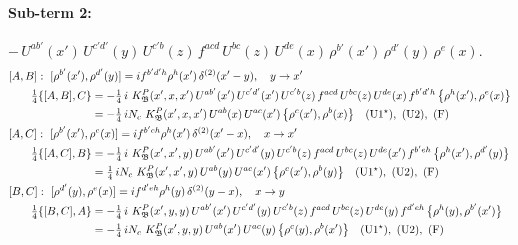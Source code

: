 \documentclass[10pt]{article}
\numberwithin{equation}{section}
\begin{document}
\paragraph{Sub-term 2:} $-\,U^{ab'}(x')\,U^{c'd'}(y)\,U^{c'b}(z)\,f^{acd}\,U^{bc}(z)\,U^{de}(x)\,\rho^{b'}(x')\,\rho^{d'}(y)\,\rho^{e}(x)$.
\begin{align}
&[A,B]:\ [\rho^{b'}(x'),\rho^{d'}(y)]=i f^{b'd'h}\rho^{h}(x')\,\delta^{(2)}(x'-y),\quad y\to x'\notag\\
&\qquad \tfrac14\{[A,B],C\}=-\tfrac14\,i\,\,K^{P}_{\mathfrak B}(x',x,x')\,U^{ab'}(x')\,U^{c'd'}(x')\,U^{c'b}(z)\,f^{acd}\,U^{bc}(z)\,U^{de}(x)\,f^{b'd'h}\,\big\{\rho^{h}(x'),\rho^{e}(x)\big\}\notag\\
&\qquad\phantom{\tfrac14\{[A,B],C\}}=-\tfrac14\,i N_{c}\,\,K^{P}_{\mathfrak B}(x',x,x')\,U^{ab}(x)\,U^{ac}(x')\,\big\{\rho^{c}(x'),\rho^{b}(x)\big\}\quad\text{(U1$^\star$)},\ \text{(U2)},\ \text{(F)}
\label{B:eq:GIII.I.P-2-AB}\\
&[A,C]:\ [\rho^{b'}(x'),\rho^{e}(x)]=i f^{b'eh}\rho^{h}(x')\,\delta^{(2)}(x'-x),\quad x\to x'\notag\\
&\qquad \tfrac14\{[A,C],B\}=-\tfrac14\,i\,\,K^{P}_{\mathfrak B}(x',x',y)\,U^{ab'}(x')\,U^{c'd'}(y)\,U^{c'b}(z)\,f^{acd}\,U^{bc}(z)\,U^{de}(x')\,f^{b'eh}\,\big\{\rho^{h}(x'),\rho^{d'}(y)\big\}\notag\\
&\qquad\phantom{\tfrac14\{[A,C],B\}}=\tfrac14\,i N_{c}\,\,K^{P}_{\mathfrak B}(x',x',y)\,U^{ab}(y)\,U^{ac}(x')\,\big\{\rho^{c}(x'),\rho^{b}(y)\big\}\quad\text{(U1$^\star$)},\ \text{(U2)},\ \text{(F)}
\label{B:eq:GIII.I.P-2-AC}\\
&[B,C]:\ [\rho^{d'}(y),\rho^{e}(x)]=i f^{d'eh}\rho^{h}(y)\,\delta^{(2)}(y-x),\quad x\to y\notag\\
&\qquad \tfrac14\{[B,C],A\}=-\tfrac14\,i\,\,K^{P}_{\mathfrak B}(x',y,y)\,U^{ab'}(x')\,U^{c'd'}(y)\,U^{c'b}(z)\,f^{acd}\,U^{bc}(z)\,U^{de}(y)\,f^{d'eh}\,\big\{\rho^{h}(y),\rho^{b'}(x')\big\}\notag\\
&\qquad\phantom{\tfrac14\{[B,C],A\}}=-\tfrac14\,i N_{c}\,\,K^{P}_{\mathfrak B}(x',y,y)\,U^{ab}(x')\,U^{ac}(y)\,\big\{\rho^{c}(y),\rho^{b}(x')\big\}\quad\text{(U1$^\star$)},\ \text{(U2)},\ \text{(F)}
\label{B:eq:GIII.I.P-2-BC}
\end{align}
\end{document}
